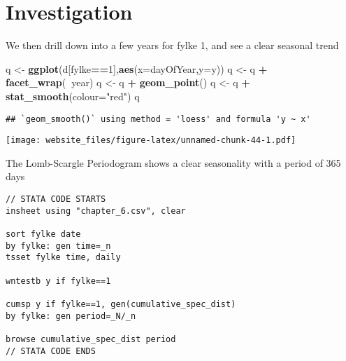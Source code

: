 \documentclass[]{book}
\newenvironment{Shaded}{\begin{snugshade}}{\end{snugshade}}
\newcommand{\KeywordTok}[1]{\textcolor[rgb]{0.13,0.29,0.53}{\textbf{#1}}}
\newcommand{\DataTypeTok}[1]{\textcolor[rgb]{0.13,0.29,0.53}{#1}}
\newcommand{\DecValTok}[1]{\textcolor[rgb]{0.00,0.00,0.81}{#1}}
\newcommand{\StringTok}[1]{\textcolor[rgb]{0.31,0.60,0.02}{#1}}
\newcommand{\OperatorTok}[1]{\textcolor[rgb]{0.81,0.36,0.00}{\textbf{#1}}}
\newcommand{\NormalTok}[1]{#1}
\begin{document}
\begin{Shaded}
\begin{Highlighting}[]
{{{{\KeywordTok{fwrite}\NormalTok{(d,}\StringTok{"data/chapter_6.csv"}\NormalTok{)}
\end{Highlighting}
\end{Shaded}

\newpage

\section{Investigation}\label{investigation-2}

We then drill down into a few years for fylke 1, and see a clear
seasonal trend

\begin{Shaded}
\begin{Highlighting}[]
\NormalTok{q <-}\StringTok{ }\KeywordTok{ggplot}\NormalTok{(d[fylke}\OperatorTok{==}\DecValTok{1}\NormalTok{],}\KeywordTok{aes}\NormalTok{(}\DataTypeTok{x=}\NormalTok{dayOfYear,}\DataTypeTok{y=}\NormalTok{y))}
\NormalTok{q <-}\StringTok{ }\NormalTok{q }\OperatorTok{+}\StringTok{ }\KeywordTok{facet_wrap}\NormalTok{(}\OperatorTok{~}\NormalTok{year)}
\NormalTok{q <-}\StringTok{ }\NormalTok{q }\OperatorTok{+}\StringTok{ }\KeywordTok{geom_point}\NormalTok{()}
\NormalTok{q <-}\StringTok{ }\NormalTok{q }\OperatorTok{+}\StringTok{ }\KeywordTok{stat_smooth}\NormalTok{(}\DataTypeTok{colour=}\StringTok{"red"}\NormalTok{)}
\NormalTok{q}
\end{Highlighting}
\end{Shaded}

\begin{verbatim}
## `geom_smooth()` using method = 'loess' and formula 'y ~ x'
\end{verbatim}

\texttt{[image: website\_files/figure-latex/unnamed-chunk-44-1.pdf]}

\newpage

The Lomb-Scargle Periodogram shows a clear seasonality with a period of
365 days

\begin{verbatim}
// STATA CODE STARTS
insheet using "chapter_6.csv", clear

sort fylke date
by fylke: gen time=_n
tsset fylke time, daily

wntestb y if fylke==1

cumsp y if fylke==1, gen(cumulative_spec_dist)
by fylke: gen period=_N/_n

browse cumulative_spec_dist period
// STATA CODE ENDS
\end{verbatim}
\end{document}
